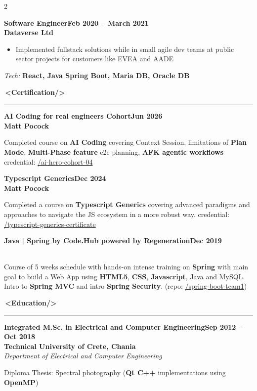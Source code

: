 \documentclass[10pt,a4paper]{article}
\newcommand{\faCertificate}{}%
\newcommand{\faGraduationCap}{}%
\newcommand{\xmlsection}[2][]{%
    \par\vspace{6pt}%
    {\Large\bfseries\color{accent}#1\,\textless#2/\textgreater}%
    \par\vspace{2pt}%
    {\color{accent}\rule{\linewidth}{0.6pt}}\par\vspace{4pt}%
}
\newcommand{\jobentry}[4]{%
    \par\vspace{4pt}%
    \noindent\textbf{#1}\hfill\textbf{#2}\\%
    \textbf{#3}\\%
    \textit{#4}\par\vspace{2pt}%
}
\newenvironment{cvitems}{%
    \begin{itemize}[leftmargin=1.1em,topsep=2pt,itemsep=1pt,parsep=0pt]%
}{%
    \end{itemize}%
}
\newcommand{\techstack}[1]{%
    \vspace{2pt}\noindent\textit{Tech:} \textbf{#1}\par%
}
\begin{document}
\begin{paracol}{2}
\jobentry{Software Engineer}{Feb 2020 -- March 2021}{Dataverse Ltd}{}
\begin{cvitems}
    \item Implemented fullstack solutions while in small agile dev teams at public sector projects for customers like EVEA and AADE
\end{cvitems}
\techstack{React, Java Spring Boot, Maria DB, Oracle DB}

\xmlsection[\faCertificate]{Certification}

\jobentry{AI Coding for real engineers Cohort}{Jun 2026}{Matt Pocock}{}
Completed course on \textbf{AI Coding} covering Context Session,
limitations of \textbf{Plan Mode}, \textbf{Multi-Phase feature} e2e planning, \textbf{AFK agentic workflows} 
credential: \href{https://lnkd.in/p/dK7tymzW}{/ai-hero-cohort-04}

\jobentry{Typescript Generics}{Dec 2024}{Matt Pocock}{}
Completed a course on \textbf{Typescript Generics} covering advanced paradigms
and approaches to navigate the JS ecosystem in a more robust way.
credential: \href{https://res.cloudinary.com/total-typescript/image/upload/v1734378527/certificate/fbf94fc5-9891-4584-93eb-387b76f13171/typescript-generics.png}{/typescript-generics-certificate}

\jobentry{Java | Spring by Code.Hub powered by Regeneration}{Dec 2019}{}{}
Course of 5 weeks schedule with hands-on intense training on \textbf{Spring} with main goal
to build a Web App using \textbf{HTML5}, \textbf{CSS}, \textbf{Javascript}, Java and MySQL.
Intro to \textbf{Spring MVC} and intro \textbf{Spring Security}.
(repo: \href{https://github.com/geogeorgiou/spring-boot-team1}{/spring-boot-team1})

\newpage

\xmlsection[\faGraduationCap]{Education}

\jobentry{Integrated M.Sc. in Electrical and Computer Engineering}{Sep 2012 -- Oct 2018}{Technical University of Crete, Chania}{Department of Electrical and Computer Engineering}

Diploma Thesis: Spectral photography (\textbf{Qt C++} implementations using \textbf{OpenMP})

\end{paracol}
\end{document}
